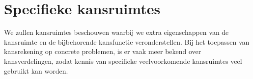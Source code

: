 \documentclass[a4paper]{report}
\theoremstyle{definition}
\begin{document}
\chapter{Specifieke kansruimtes}

We zullen kansruimtes beschouwen waarbij we extra eigenschappen van de kansruimte en de bijbehorende kansfunctie veronderstellen.
Bij het toepassen van kansrekening op concrete problemen, is er vaak meer bekend over kansverdelingen, zodat kennis van specifieke veelvoorkomende kansruimtes veel gebruikt kan worden.
%
%
%
%
\end{document}
